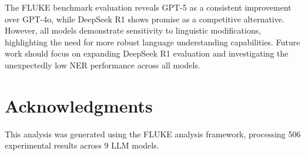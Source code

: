 \documentclass[11pt]{article}
\begin{document}
The FLUKE benchmark evaluation reveals GPT-5 as a consistent improvement over GPT-4o, while DeepSeek R1 
shows promise as a competitive alternative. However, all models demonstrate sensitivity to linguistic 
modifications, highlighting the need for more robust language understanding capabilities. Future work 
should focus on expanding DeepSeek R1 evaluation and investigating the unexpectedly low NER performance 
across all models.

\section*{Acknowledgments}

This analysis was generated using the FLUKE analysis framework, processing 506 experimental results 
across 9 LLM models.
\end{document}
